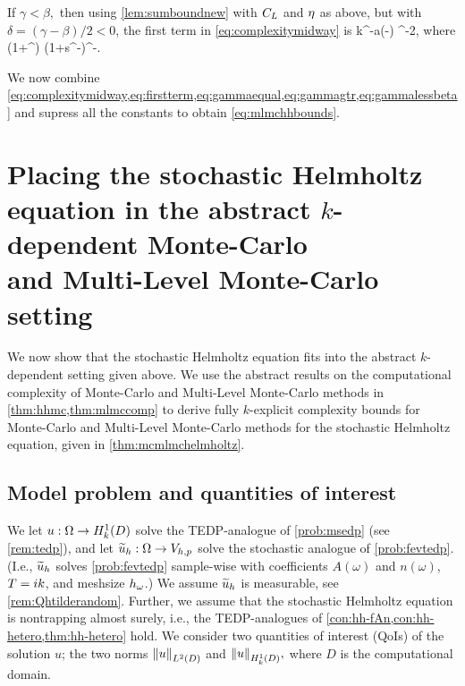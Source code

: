 If $\gamma < \beta,$ then using \cref{lem:sumboundnew} with $C_{L}$ and $\eta$ as above, but with $\delta = (\gamma-\beta)/2 < 0$, the first term in \eqref{eq:complexitymidway} is
\beq\label{eq:gammalessbeta}
\Cgammalessbeta k^{\tau  -a\mleft(\beta-\gamma\mright)} \eps^{-2},
\eeq
where
\beqs\label{eq:gammaless}
\Cgammalessbeta {}\ct \cth\mleft(1+\Ccoarse^{\gamma}\mright) \mleft(1+s^{-\gamma}\mright)\Ccoarse^{\beta-\gamma}.
\eeqs

We now combine \cref{eq:complexitymidway,eq:firstterm,eq:gammaequal,eq:gammagtr,eq:gammalessbeta} and supress all the constants to obtain \cref{eq:mlmchhbounds}.
\epf



\section[The Helmholtz equation in the abstract setting]{Placing the stochastic Helmholtz equation in the abstract $k$-dependent Monte-Carlo\\ and Multi-Level Monte-Carlo setting}\label{sec:mlmcapplying}

We now show that the stochastic Helmholtz equation fits into the abstract $k$-dependent setting given above. We use the abstract results on the computational complexity of Monte-Carlo and Multi-Level Monte-Carlo methods in \cref{thm:hhmc,thm:mlmccomp} to derive fully $k$-explicit complexity bounds for Monte-Carlo and Multi-Level Monte-Carlo methods for the stochastic Helmholtz equation, given in \cref{thm:mcmlmchelmholtz}.

\subsection{Model problem and quantities of interest}\label{sec:mlmcmodel}

We let $u:\Omega\rightarrow\HokD$ solve the TEDP-analogue of \cref{prob:msedp} (see \cref{rem:tedp}), and let $\widetilde{u}_{h}:\Omega\rightarrow V_{h,p}$ solve the stochastic analogue of \cref{prob:fevtedp}. (I.e., $\widetilde{u}_{h}$ solves \cref{prob:fevtedp} sample-wise with coefficients $A(\omega)$ and $n(\omega)$, $T = ik$, and meshsize $h_{\omega}$.) We assume $\widetilde{u}_{h}$ is measurable, see \cref{rem:Qhtilderandom}. Further, we assume that the stochastic Helmholtz equation is nontrapping almost surely, i.e., the TEDP-analogues of \cref{con:hh-fAn,con:hh-hetero,thm:hh-hetero} hold. We consider two quantities of interest (QoIs) of the solution $u$; the two norms $\NLtD{u}$ and $\NHokD{u},$ where $D$ is the computational domain.

